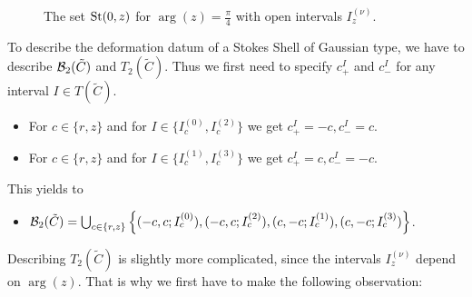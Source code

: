 \begin{figure}[h!]
\begin{minipage}{0.48\textwidth}
\captionsetup{font=small}
\caption{The set $\operatorname{St}(0,z)$ for $\arg(z)=\frac{\pi}{4}$ with open intervals $I^{(\nu)}_z$.}
\end{minipage}
\end{figure}


To describe the deformation datum of a Stokes Shell of Gaussian type, we have to describe $\mathcal{B}_2(\tilde{C})$ and $T_2(\tilde{C})$. Thus we first need to specify $c_+^{I}$ and $c_-^{I}$ for any interval $I \in T(\tilde{C})$. 
\begin{itemize}
    \item For $c \in \{r,z\}$ and for $I \in \{I_c^{(0)},I_c^{(2)}\}$ we get $c_+^{I} = -c, c_-^{I} = c$.
    \item For $c \in \{r,z\}$ and for $I \in \{I_c^{(1)}, I_c^{(3)}\}$ we get $c_+^{I} = c, c_-^{I} = -c$.
\end{itemize}
This yields to
\begin{itemize}
    \item $\mathcal{B}_2(\tilde{C}) =\bigcup_{c \in \{r,z\}} \left\{(-c,c;I_c^{(0)}),(-c,c;I_c^{(2)}),(c,-c;I_c^{(1)}),(c,-c;I_c^{(3)})\right\}$.
\end{itemize}
Describing $T_2(\tilde{C})$ is slightly more complicated, since the intervals $I_z^{(\nu)}$ depend on $\arg(z)$. That is why we first have to make the following observation: 

